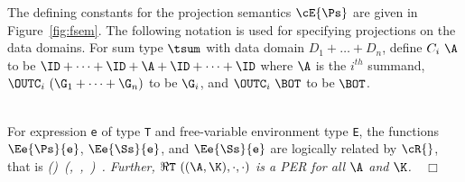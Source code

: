 \begin{article}

The defining constants for the projection semantics $\cE{\Ps}$ are
given in Figure~\ref{fig:fsem}. The following notation is used for
specifying projections on the data domains.  For sum type $\tsum$ with
data domain $D_1\plus\ldots\plus D_n$, define $C_i~\A$ to be
$\ID+\cdots+\ID+\A+\ID+\cdots+\ID$ where $\A$ is the $i^{th}$ summand,
$\OUTC_i~(\G_1+\cdots+\G_n)$ to be $\G_i$, and $\OUTC_i~\BOT$ to be
$\BOT$.

\ \\  For expression \mbox{\tt e} of type
\mbox{\tt T} and free-variable environment type \mbox{\tt E}, the functions
$\Ee{\Ps}{\mbox{\tt e}}$, $\Ee{\Ss}{\mbox{\tt e}}$, and $\Ee{\Ss}{\mbox{\tt e}}$ are logically
related by $\cR{}$, that is
\beqs
\it (\fto{})\ (,\ ,\ )\ .
\eeqs
Further, $\Re{}{\mbox{\tt T}}~((\A,\K),\cdot,\cdot)$ is a PER for all $\A$ and
$\K$.\ \ $\Box$


\end{article}
